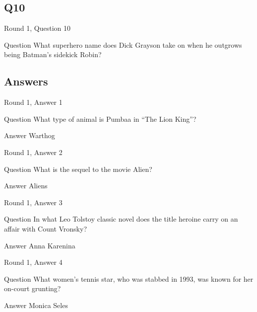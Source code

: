 \documentclass[11pt]{beamer}
\begin{document}
\subsection*{Q10}
\begin{frame}[t]{Round 1, Question 10}
\vspace{2em}
\begin{block}{Question}
What superhero name does Dick Grayson take on when he outgrows being Batman's sidekick Robin\@?
\end{block}
\end{frame}
    
\subsection{Answers}

\begin{frame}[t]{Round 1, Answer 1}
\vspace{2em}
\begin{block}{Question}
What type of animal is Pumbaa in ``The Lion King''\@?
\end{block}
\pause{}
\begin{block}{Answer}
Warthog
\end{block}
\end{frame}
    

\begin{frame}[t]{Round 1, Answer 2}
\vspace{2em}
\begin{block}{Question}
What is the sequel to the movie Alien\@?
\end{block}
\pause{}
\begin{block}{Answer}
Aliens
\end{block}
\end{frame}
    

\begin{frame}[t]{Round 1, Answer 3}
\vspace{2em}
\begin{block}{Question}
In what Leo Tolstoy classic novel does the title heroine carry on an affair with Count Vronsky\@?
\end{block}
\pause{}
\begin{block}{Answer}
Anna Karenina
\end{block}
\end{frame}
    

\begin{frame}[t]{Round 1, Answer 4}
\vspace{2em}
\begin{block}{Question}
What women's tennis star, who was stabbed in 1993, was known for her on-court grunting\@?
\end{block}
\pause{}
\begin{block}{Answer}
Monica Seles
\end{block}
\end{frame}
    
\end{document}
